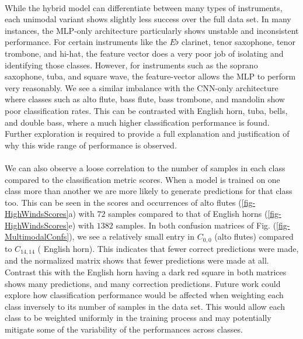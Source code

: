 \documentclass[12pt,letterpaper]{article}
\begin{document}
\paragraph*{}While the hybrid model can differentiate between many types of instruments, each unimodal variant shows slightly less success over the full data set. In many instances, the MLP-only architecture particularly shows unstable and inconsistent performance. For certain instruments like the $E\flat$ clarinet, tenor saxophone, tenor trombone, and hi-hat, the feature vector does a very poor job of isolating and identifying those classes. However, for instruments such as the soprano saxophone, tuba, and square wave, the feature-vector allows the MLP to perform very reasonably. We see a similar imbalance with the CNN-only architecture where classes such as alto flute, bass flute, bass trombone, and mandolin show poor classification rates. This can be contrasted with English horn, tuba, bells, and double bass, where a much higher classification performance is found. Further exploration is required to provide a full explanation and justification of why this wide range of performance is observed.

\paragraph*{}We can also observe a loose correlation to the number of samples in each class compared to the classification metric scores. When a model is trained on one class more than another we are more likely to generate predictions for that class too. This can be seen in the scores and occurrences of alto flutes (\ref{fig-HighWindsScores}a) with $72$ samples compared to that of English horns (\ref{fig-HighWindsScores}e) with $1382$ samples. In both confusion matrices of Fig. (\ref{fig-MultimodalConfs}), we see a relatively small entry in $C_{0,0}$ (alto flutes) compared to $C_{14,14}$ ( English horn). This indicates that fewer correct predictions were made, and the normalized matrix shows that fewer predictions were made at all. Contrast this with the English horn having a dark red square in both matrices shows many predictions, and many correction predictions. Future work could explore how classification performance would be affected when weighting each class inversely to its number of samples in the data set. This would allow each class to be weighted uniformly in the training process and may potentially mitigate some of the variability of the performances across classes.
\end{document}
